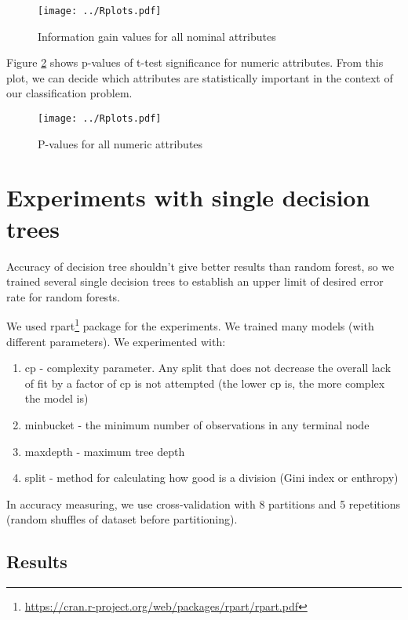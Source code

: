 \documentclass[a4paper]{article}
\begin{document}
\begin{multicols}{2}
\begin{figure}[H]
    \centering
    \texttt{[image: ../Rplots.pdf]}
    \caption[]{Information gain values for all nominal attributes
    \label{fig:nominalIG}
    }
\end{figure}


Figure \ref{fig:pval} shows p-values of t-test significance for numeric attributes.
From this plot, we can decide which attributes are statistically important
in the context of our classification problem.

\begin{figure}[H]
    \centering
    \texttt{[image: ../Rplots.pdf]}
    \caption[]{P-values for all numeric attributes
    \label{fig:pval}
    }
\end{figure}


\section{Experiments with single decision trees}
\label{expSingle}

Accuracy of decision tree shouldn't give better results than random forest,
so we trained several single decision trees to establish
an upper limit of desired error rate for random forests.

We used rpart\footnote{\url{https://cran.r-project.org/web/packages/rpart/rpart.pdf}} package for the experiments.
We trained many models (with different parameters).
We experimented with:
\begin{enumerate}
    \item cp - complexity parameter.
        Any split that does not decrease the overall lack of fit by a factor of cp is not attempted
        (the lower cp is, the more complex the model is)
    \item minbucket - the minimum number of observations in any terminal node
    \item maxdepth - maximum tree depth
    \item split - method for calculating how good is a division (Gini index or enthropy)
\end{enumerate}
In accuracy measuring, we use cross-validation with 8 partitions
and 5 repetitions (random shuffles of dataset before partitioning).
% 
\subsection{Results}
\label{singleConc}


\end{multicols}
\end{document}
